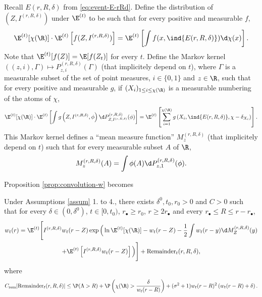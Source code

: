 \documentclass[10pt,a4paper]{article}
\begin{document}
Recall $E(r,R,\delta)$ from \eqref{eq:event-E-rRd}.  
Define the distribution of $(Z, I^{(r,R,\delta)})$ under $\E^{(t)}$ to be such that for every positive and measurable $f$, 
\begin{equation}\label{eq:2def-ZI-vol}
\E^{(t)}[\chi(\R)] \cdot \E^{(t)}\left[ f(Z, I^{(r,R,\delta)}) \right] = \E^{(t)}\left[ \int f(x,\ind{E(r,R,\delta)}) \d\chi(x) \right] .
\end{equation}
Note that $\E^{(t)}[f(Z)] = \E[f(Z_t)]$ for every $t$. Define the Markov kernel $((z,i), \Gamma) \mapsto P^{(r,R,\delta)}_{z,i}(\Gamma)$ (that implicitely depend on $t$), where $\Gamma$ is a measurable subset of the set of point measures, $i\in\{0,1\}$ and $z\in\R$, such that for every positive and measurable $g$, if $(X_i)_{1\leq i \leq \chi(\R)}$ is a measurable numbering of the atoms of $\chi$, 
\begin{equation}\label{eq:2def-Palm-vol}
\E^{(t)}[\chi(\R)] \cdot  \E^{(t)}\left[ \int g\left(Z, I^{(r,R,\delta)}, \phi \right) \d P^{(r,R,\delta)}_{Z, I^{(r,R,\delta)}}(\phi) \right] = \E^{(t)}\left[ \sum_{i=1}^{\chi(\R)} g\left(X_i , \ind{E(r,R,\delta)}, \chi - \delta_{X_i} \right) \right] .
\end{equation} 
This Markov kernel defines a ``mean measure function'' $M^{(r,R,\delta)}_{z}$ (that implicitely depend on $t$) such that for every measurable subset $A$ of $\R$, 
\begin{equation}\label{eq:2def-Palm-mean-vol}
M^{(r,R,\delta)}_{z}(A) = \int \phi(A) \d P^{(r,R,\delta)}_{z,1}(\phi) . 
\end{equation}

Proposition \ref{prop:convolution-w} becomes 

\begin{proposition}\label{prop:2convolution-w-vol}
Under Assumptions \ref{assum} 1. to 4., there exists $\delta^0, t_0, r_0>0$ and $C>0$ such that for every $\delta \in (0,\delta^0)$, $t\in [0,t_0)$, $r_\bullet \geq r_0$, $r\geq 2r_\bullet$ and every $r_\bullet \leq R \leq  r-r_\bullet$, 
\begin{multline}\label{eq:2convolution-w-vol}
w_t(r) = \E^{(t)}\Bigg[ I^{(r,R,\delta)} w_t(r-Z) \exp\Big( \ln\E^{(t)}[\chi(\R)] - w_t(r-Z) - \frac{1}{2} \int w_t(r-y) \d M^{(r,R,\delta)}_{Z} (y) \\
+ \E^{(t)}\left[ I^{(r,R,\delta)} w_t(r-Z) \right] \Big) \Bigg] + \mathrm{Remainder}_t(r,R,\delta) ,
\end{multline}
where 
\begin{equation*} 
C_\mathrm{rem} |\mathrm{Remainder}_t(r,R,\delta)| \leq \P(\Lambda>R) + \P\left(\chi(\R)>\frac{\delta}{w_t(r-R)}\right) + (\sigma^2 + 1) w_t(r-R)^2 \left( w_t(r-R) + \delta \right) .
\end{equation*}
\end{proposition}
\end{document}
